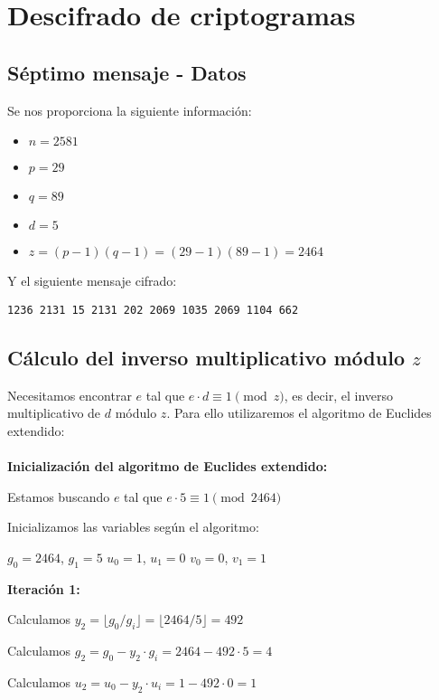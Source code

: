 \section{Descifrado de criptogramas}

\subsection{Séptimo mensaje - Datos}

Se nos proporciona la siguiente información:

\begin{itemize}
\item $n = 2581$
\item $p = 29$
\item $q = 89$
\item $d = 5$
\item $z = (p-1)(q-1) = (29-1)(89-1) = 2464$
\end{itemize}

Y el siguiente mensaje cifrado:

\begin{verbatim}
1236 2131 15 2131 202 2069 1035 2069 1104 662
\end{verbatim}

\subsection{Cálculo del inverso multiplicativo módulo $z$}

Necesitamos encontrar $e$ tal que $e \cdot d \equiv 1 \pmod{z}$, es decir, el inverso multiplicativo de $d$ módulo $z$. Para ello utilizaremos el algoritmo de Euclides extendido:
\\\\
\textbf{Inicialización del algoritmo de Euclides extendido:}

Estamos buscando $e$ tal que $e \cdot 5 \equiv 1 \pmod{2464}$

Inicializamos las variables según el algoritmo:

$g_0 = 2464$, $g_1 = 5$
$u_0 = 1$, $u_1 = 0$
$v_0 = 0$, $v_1 = 1$


\textbf{Iteración 1:}

Calculamos $y_2 = \lfloor g_0 / g_i \rfloor = \lfloor 2464 / 5 \rfloor = 492$

Calculamos $g_2 = g_0 - y_2 \cdot g_i = 2464 - 492 \cdot 5 = 4$

Calculamos $u_2 = u_0 - y_2 \cdot u_i = 1 - 492 \cdot 0 = 1$

